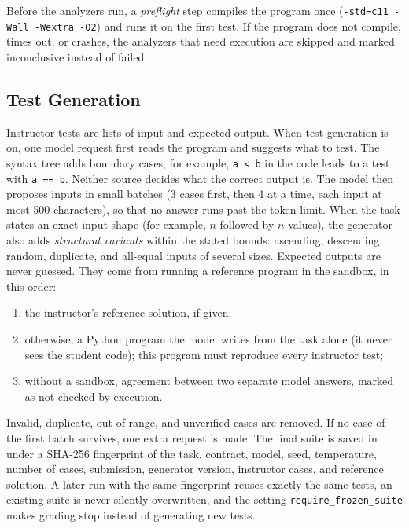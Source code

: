 \documentclass[conference]{IEEEtran}
\begin{document}
Before the analyzers run, a \emph{preflight} step compiles the program once
(\texttt{-std=c11 -Wall -Wextra -O2}) and runs it on the first test. If the
program does not compile, times out, or crashes, the analyzers that need
execution are skipped and marked inconclusive instead of failed.

\subsection{Test Generation}
\label{sec:testgen}
Instructor tests are lists of input and expected output. When test generation is
on, one model request first reads the program and suggests what to test. The
syntax tree adds boundary cases; for example, \texttt{a < b} in the code leads to
a test with \texttt{a == b}. Neither source decides what the correct output is.
The model then proposes inputs in small batches (3 cases first, then 4 at a time,
each input at most 500 characters), so that no answer runs past the token limit.
When the task states an exact input shape (for example, $n$ followed by $n$
values), the generator also adds \emph{structural variants} within the stated
bounds: ascending, descending, random, duplicate, and all-equal inputs of several
sizes. Expected outputs are never guessed. They come from running a reference
program in the sandbox, in this order:
\begin{enumerate}
  \item the instructor's reference solution, if given;
  \item otherwise, a Python program the model writes from the task alone (it
        never sees the student code); this program must reproduce every
        instructor test;
  \item without a sandbox, agreement between two separate model answers, marked
        as not checked by execution.
\end{enumerate}
Invalid, duplicate, out-of-range, and unverified cases are removed. If no case
of the first batch survives, one extra request is made. The final suite is saved
in  under a SHA-256 fingerprint of the task, contract,
model, seed, temperature, number of cases, submission, generator version,
instructor cases, and reference solution. A later run with the same fingerprint
reuses exactly the same tests, an existing suite is never silently overwritten,
and the setting \texttt{require\_frozen\_suite} makes grading stop instead of
generating new tests.
\end{document}
